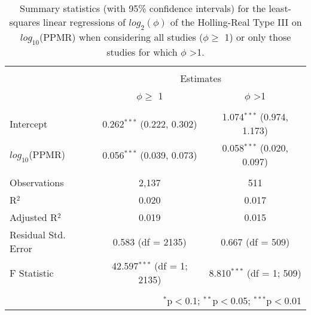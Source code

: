 
\begin{table}[!htbp] \centering 
  \caption{Summary statistics (with 95\% confidence intervals) for the least-squares linear regressions of $log_2(\phi)$ of the Holling-Real Type III on $log_{10}$(PPMR) when considering all studies ($\phi \geq$ 1) or only those studies for which $\phi$ \textgreater 1.} 
  \label{tab:m-ppmr} 
\begin{tabular}{@{\extracolsep{5pt}}lcc} 
\\[-1.8ex]\hline 
\hline \\[-1.8ex] 
 & \multicolumn{2}{c}{Estimates} \\ 
\cline{2-3} 
 & $\phi \geq$ 1 & $\phi$ \textgreater 1 \\ 
\hline \\[-1.8ex] 
 Intercept & 0.262$^{***}$ (0.222, 0.302) & 1.074$^{***}$ (0.974, 1.173) \\ 
  $log_{10}$(PPMR) & 0.056$^{***}$ (0.039, 0.073) & 0.058$^{***}$ (0.020, 0.097) \\ 
 \hline \\[-1.8ex] 
Observations & 2,137 & 511 \\ 
R$^{2}$ & 0.020 & 0.017 \\ 
Adjusted R$^{2}$ & 0.019 & 0.015 \\ 
Residual Std. Error & 0.583 (df = 2135) & 0.667 (df = 509) \\ 
F Statistic & 42.597$^{***}$ (df = 1; 2135) & 8.810$^{***}$ (df = 1; 509) \\ 
\hline 
\hline \\[-1.8ex] 
\multicolumn{3}{r}{$^{*}$p$<$0.1; $^{**}$p$<$0.05; $^{***}$p$<$0.01} \\ 
\end{tabular} 
\end{table} 
